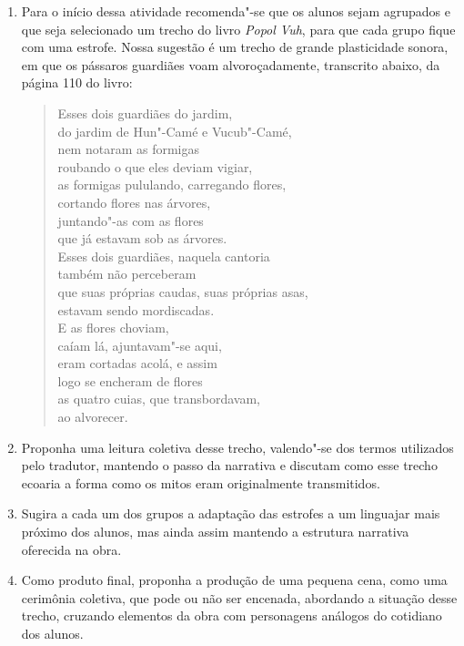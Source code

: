 \documentclass[11pt]{extarticle}
\begin{document}
\begin{enumerate}
\item
Para o início dessa atividade recomenda"-se que os alunos sejam agrupados e que
seja selecionado um trecho do livro \emph{Popol Vuh}, para que cada grupo fique 
com uma estrofe. Nossa sugestão é um trecho de grande plasticidade sonora, em que 
os pássaros guardiães voam alvoroçadamente, transcrito abaixo, da página 110 do livro:

\begin{verse}
Esses dois guardiães do jardim,\\
do jardim de Hun"-Camé e Vucub"-Camé,\\
nem notaram as formigas\\
roubando o que eles deviam vigiar,\\
as formigas pululando, carregando flores,\\
cortando flores nas árvores,\\
juntando"-as com as flores\\
que já estavam sob as árvores.\\


Esses dois guardiães, naquela cantoria\\
também não perceberam\\
que suas próprias caudas, suas próprias asas,\\
estavam sendo mordiscadas.\\


E as flores choviam,\\
caíam lá, ajuntavam"-se aqui,\\
eram cortadas acolá, e assim\\
logo se encheram de flores\\
as quatro cuias, que transbordavam,\\
ao alvorecer.
\end{verse}

\item
Proponha uma leitura coletiva desse trecho, valendo"-se dos termos utilizados pelo 
tradutor, mantendo o passo da narrativa e discutam como esse trecho ecoaria a forma como 
os mitos eram originalmente transmitidos.

\item
Sugira a cada um dos grupos a adaptação das estrofes a um linguajar mais próximo dos alunos, mas
ainda assim mantendo a estrutura narrativa oferecida na obra.

\item
Como produto final, proponha a produção de uma pequena cena, como uma cerimônia coletiva, 
que pode ou não ser encenada, abordando a situação desse trecho, cruzando 
elementos da obra com personagens análogos do cotidiano dos alunos.

\end{enumerate}
\end{document}

